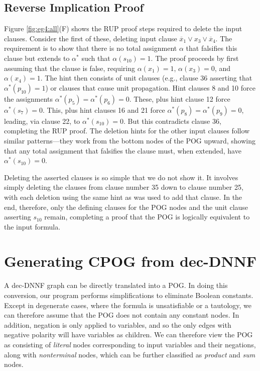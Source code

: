 \documentclass[twoside,11pt]{article}
\newcommand{\obar}[1]{\overline{#1}}
\newcommand{\extend}[1]{#1^{*}}
\newcommand{\assign}{\alpha}
\newcommand{\eassign}{\extend{\alpha}}
\newcommand{\progname}[1]{\textsc{#1}}
\newcommand{\dfour}{\progname{D4}}
\begin{document}
\subsection{Reverse Implication Proof}

Figure \ref{fig:eg4:all}(F) shows the RUP proof steps required to
delete the input clauses.  Consider the first of these, deleting
input clause $\obar{x}_1 \lor x_3 \lor \obar{x}_4$.  The requirement is to show
that there is no total assignment $\assign$ that falsifies this clause but extends to $\eassign$ such that  $\assign(s_{10}) = 1$.
The proof proceeds by first assuming that the clause is false, requiring
$\assign(x_1) = 1$, $\assign(x_3) = 0$, and $\assign(x_4) = 1$.  The hint then consists of unit
clauses (e.g., clause 36 asserting that $\eassign(p_{10}) = 1$) or
clauses that cause unit propagation.  Hint clauses 8 and 10 force the
assignments $\eassign(p_5) = \eassign(p_6) = 0$.  These, plus hint clause 12 force
$\eassign(s_7) = 0$.  This, plus hint clauses 16 and 21 force $\eassign(p_8) = \eassign(p_9) = 0$, leading,
via clause 22, to $\eassign(s_{10}) = 0$.  But this contradicts clause 36,
completing the RUP proof.  The deletion hints for the other input
clauses follow similar patterns---they work from the bottom nodes of
the POG upward, showing that any total assignment that falsifies the clause
must, when extended, have $\eassign(s_{10}) = 0$.

Deleting the asserted clauses is so simple that we do not show it.  It
involves simply deleting the clauses from clause number 35 down to
clause number 25, with each deletion using the same hint as was used
to add that clause.  In the end, therefore, only the defining clauses
for the POG nodes and the unit clause asserting $s_{10}$ remain,
completing a proof that the POG is logically equivalent to the input
formula.

\section{Generating CPOG from dec-DNNF}
\label{sect:generating:cpog}

A dec-DNNF
graph can be directly translated  into a POG.
In doing this conversion,
our program performs simplifications to
eliminate Boolean constants.
Except in degenerate cases,
where the formula is unsatisfiable or a tautology,
we can therefore assume
that the POG does not contain any constant nodes.
In addition, negation is only
applied to variables, and so the only edges with negative polarity will have variables as children.
We can therefore
view the POG as consisting
of \emph{literal} nodes corresponding to input variables and their negations, along with
\emph{nonterminal} nodes, which can be further classified as \emph{product} and \emph{sum} nodes.
\end{document}
